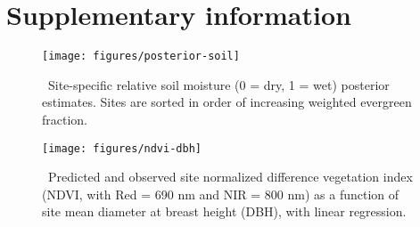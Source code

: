 \section{Supplementary information}

\begin{figure}[ht]
  \centering
  \texttt{[image: figures/posterior-soil]}
  \caption{\label{fig:posterior-soil}\
    Site-specific relative soil moisture (0 = dry, 1 = wet) posterior estimates.
    Sites are sorted in order of increasing weighted evergreen fraction.
  }
\end{figure}

\begin{figure}[ht]
  \centering
  \texttt{[image: figures/ndvi-dbh]}
  \caption{\label{fig:ndvi-dbh}\
    Predicted and observed site normalized difference vegetation index (NDVI, with Red = 690 nm and NIR = 800 nm)
    as a function of site mean diameter at breast height (DBH), with linear regression.
  }
\end{figure}







